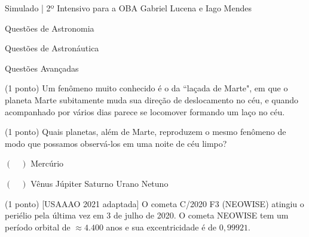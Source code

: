 \documentclass{../lista}
\begin{document}
	\cabecalhoAlt
		{Simulado | 2º Intensivo para a OBA}
		{}
		{Gabriel Lucena e Iago Mendes}


	\begin{secao}{Questões de Astronomia}
	\end{secao}

	\begin{secao}{Questões de Astronáutica}
	\end{secao}

	\begin{secao}{Questões Avançadas}
		\begin{questao}{(1 ponto)}
			Um fenômeno muito conhecido é o da ``laçada de Marte", em que o planeta Marte subitamente muda sua direção de deslocamento no céu, e quando acompanhado por vários dias parece se locomover formando um laço no céu.

			\begin{pergunta}{(1 ponto)}
				Quais planetas, além de Marte, reproduzem o mesmo fenômeno de modo que possamos observá-los em uma noite de céu limpo?


				\begin{multicols}{3}
					\begin{alternativas}
						\item[$(\quad)$] Mercúrio
						\item[$(\quad)$] Vênus
						\alternativaMarcada Júpiter
						\alternativaMarcada Saturno
						\alternativaMarcada Urano
						\alternativaMarcada Netuno
					\end{alternativas}
				\end{multicols}
			\end{pergunta}
		\end{questao}

		\begin{questao}{(1 ponto) [USAAAO 2021 adaptada]}
			O cometa C/2020 F3 (NEOWISE) atingiu o periélio pela última vez em 3 de julho de 2020. O cometa NEOWISE tem um período orbital de $\approx 4.400$ anos e sua excentricidade é de $0,99921$.


\end{questao}
\end{secao}
\end{document}
